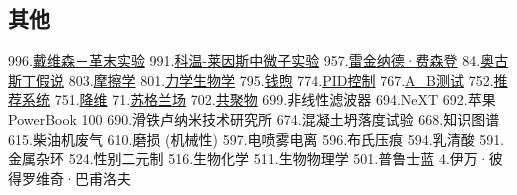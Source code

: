\subsection{其他}
996.\href{https://wuli.wiki/assets/sogou/996.%E6%88%B4%E7%BB%B4%E6%A3%AE%EF%BC%8D%E9%9D%A9%E6%9C%AB%E5%AE%9E%E9%AA%8C%20-%20%E6%90%9C%E7%8B%97%E7%A7%91%E5%AD%A6%E7%99%BE%E7%A7%91.html}{戴维森－革末实验}
991.\href{https://wuli.wiki/assets/sogou/991.%E7%A7%91%E6%B8%A9-%E8%8E%B1%E5%9B%A0%E6%96%AF%E4%B8%AD%E5%BE%AE%E5%AD%90%E5%AE%9E%E9%AA%8C%20-%20%E6%90%9C%E7%8B%97%E7%A7%91%E5%AD%A6%E7%99%BE%E7%A7%91.html}{科温-莱因斯中微子实验}
957.\href{https://wuli.wiki/assets/sogou/957.%E9%9B%B7%E9%87%91%E7%BA%B3%E5%BE%B7%C2%B7%E8%B4%B9%E6%A3%AE%E7%99%BB%20-%20%E6%90%9C%E7%8B%97%E7%A7%91%E5%AD%A6%E7%99%BE%E7%A7%91.html}{雷金纳德·费森登}
84.\href{https://wuli.wiki/assets/sogou/84.%E5%A5%A5%E5%8F%A4%E6%96%AF%E4%B8%81%E5%81%87%E8%AF%B4%20-%20%E6%90%9C%E7%8B%97%E7%A7%91%E5%AD%A6%E7%99%BE%E7%A7%91.html}{奥古斯丁假说}
803.\href{https://wuli.wiki/assets/sogou/803.%E6%91%A9%E6%93%A6%E5%AD%A6%20-%20%E6%90%9C%E7%8B%97%E7%A7%91%E5%AD%A6%E7%99%BE%E7%A7%91.html}{摩擦学}
801.\href{https://wuli.wiki/assets/sogou/801.%E5%8A%9B%E5%AD%A6%E7%94%9F%E7%89%A9%E5%AD%A6%20-%20%E6%90%9C%E7%8B%97%E7%A7%91%E5%AD%A6%E7%99%BE%E7%A7%91.html}{力学生物学}
795.\href{https://wuli.wiki/assets/sogou/795.%E9%92%B1%E7%85%A6%20-%20%E6%90%9C%E7%8B%97%E7%A7%91%E5%AD%A6%E7%99%BE%E7%A7%91.html}{钱煦}
774.\href{https://wuli.wiki/assets/sogou/774.PID%E6%8E%A7%E5%88%B6%20-%20%E6%90%9C%E7%8B%97%E7%A7%91%E5%AD%A6%E7%99%BE%E7%A7%91.html}{PID控制}
767.\href{https://wuli.wiki/assets/sogou/767.A_B%E6%B5%8B%E8%AF%95%20-%20%E6%90%9C%E7%8B%97%E7%A7%91%E5%AD%A6%E7%99%BE%E7%A7%91.html}{A_B测试}
752.\href{https://wuli.wiki/assets/sogou/752.%E6%8E%A8%E8%8D%90%E7%B3%BB%E7%BB%9F%20-%20%E6%90%9C%E7%8B%97%E7%A7%91%E5%AD%A6%E7%99%BE%E7%A7%91.html}{推荐系统}
751.\href{https://wuli.wiki/assets/sogou/751.%E9%99%8D%E7%BB%B4%20-%20%E6%90%9C%E7%8B%97%E7%A7%91%E5%AD%A6%E7%99%BE%E7%A7%91.html}{降维}
71.\href{https://wuli.wiki/assets/sogou/71.%E8%8B%8F%E6%A0%BC%E5%85%B0%E5%9C%BA%20-%20%E6%90%9C%E7%8B%97%E7%A7%91%E5%AD%A6%E7%99%BE%E7%A7%91.html}{苏格兰场}
702.\href{https://wuli.wiki/assets/sogou/702.%E5%85%B1%E8%81%9A%E7%89%A9%20-%20%E6%90%9C%E7%8B%97%E7%A7%91%E5%AD%A6%E7%99%BE%E7%A7%91.html}{共聚物}
699.非线性滤波器
694.NeXT
692.苹果 PowerBook 100
690.滑铁卢纳米技术研究所
674.混凝土坍落度试验
668.知识图谱
615.柴油机废气
610.磨损 (机械性)
597.电喷雾电离
596.布氏压痕
594.乳清酸
591.金属杂环 
524.性别二元制
516.生物化学
511.生物物理学
501.普鲁士蓝
4.伊万·彼得罗维奇·巴甫洛夫
